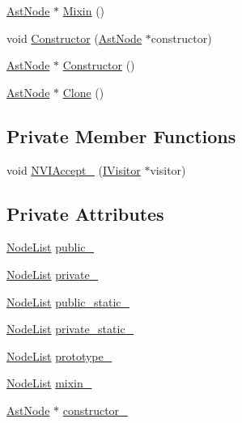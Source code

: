 \begin{DoxyCompactItemize}
\item 
\hyperlink{classmocha_1_1_ast_node}{AstNode} $\ast$ \hyperlink{classmocha_1_1_class_properties_a6249e318bd1448649b4b60d6d66134a5}{Mixin} ()
\item 
void \hyperlink{classmocha_1_1_class_properties_a9c7a8006b1a474f673b90eba72fc9830}{Constructor} (\hyperlink{classmocha_1_1_ast_node}{AstNode} $\ast$constructor)
\item 
\hyperlink{classmocha_1_1_ast_node}{AstNode} $\ast$ \hyperlink{classmocha_1_1_class_properties_a5003c61d710ffe865d08c711f623ff6d}{Constructor} ()
\item 
\hyperlink{classmocha_1_1_ast_node}{AstNode} $\ast$ \hyperlink{classmocha_1_1_class_properties_adf11918b4cefbd3a396c3c1ca34c747a}{Clone} ()
\end{DoxyCompactItemize}
\subsection*{Private Member Functions}
\begin{DoxyCompactItemize}
\item 
void \hyperlink{classmocha_1_1_class_properties_aa044f4aadf1afa40a77b480b3824534c}{NVIAccept\_\-} (\hyperlink{classmocha_1_1_i_visitor}{IVisitor} $\ast$visitor)
\end{DoxyCompactItemize}
\subsection*{Private Attributes}
\begin{DoxyCompactItemize}
\item 
\hyperlink{classmocha_1_1_node_list}{NodeList} \hyperlink{classmocha_1_1_class_properties_a2810f6c455558f888d81ee31401bf7a3}{public\_\-}
\item 
\hyperlink{classmocha_1_1_node_list}{NodeList} \hyperlink{classmocha_1_1_class_properties_ae57de33463b6c6a592eb23497bcc13b7}{private\_\-}
\item 
\hyperlink{classmocha_1_1_node_list}{NodeList} \hyperlink{classmocha_1_1_class_properties_af751d2300bd5a931f2d845dd2498b4e1}{public\_\-static\_\-}
\item 
\hyperlink{classmocha_1_1_node_list}{NodeList} \hyperlink{classmocha_1_1_class_properties_a83646affe1aeaeb0b3609a628f6110b0}{private\_\-static\_\-}
\item 
\hyperlink{classmocha_1_1_node_list}{NodeList} \hyperlink{classmocha_1_1_class_properties_a8a8d620fed2fdcc7a2255a6e71b98fa8}{prototype\_\-}
\item 
\hyperlink{classmocha_1_1_node_list}{NodeList} \hyperlink{classmocha_1_1_class_properties_ab46a87567170599e9bb1f051d25e37ba}{mixin\_\-}
\item 
\hyperlink{classmocha_1_1_ast_node}{AstNode} $\ast$ \hyperlink{classmocha_1_1_class_properties_a37e632a65dfc92d5a9d613b049810ff3}{constructor\_\-}
\end{DoxyCompactItemize}


